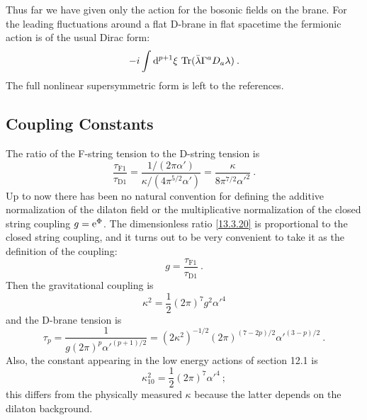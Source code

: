 Thus far we have given only the action for the bosonic fields on the brane. For the leading fluctuations around a flat D-brane in flat spacetime the fermionic action is of the usual Dirac form:
\begin{equation}
	-i\int \mathrm{d}^{p+1}\xi\,\operatorname{Tr}(\bar{\lambda}\Gamma^a D_a\lambda) \:. \label{13.3.19}
\end{equation}
The full nonlinear supersymmetric form is left to the references.

\subsection*{Coupling Constants}

The ratio of the F-string tension to the D-string tension is
\begin{equation}
	\frac{\tau_{\mathrm{F}1}}{\tau_{\mathrm{D}1}} = \frac{1/(2\pi\alpha')}{\kappa/(4\pi^{5/2}\alpha')} = \frac{\kappa}{8\pi^{7/2}{\alpha'}^2} \:. \label{13.3.20}
\end{equation}
Up to now there has been no natural convention for defining the additive normalization of the dilaton field or the multiplicative normalization of the closed string coupling $g = \mathrm{e}^{\Phi}$. The dimensionless ratio \eqref{13.3.20} is proportional to the closed string coupling, and it turns out to be very convenient to take it as the definition of the coupling:
\begin{equation}
	g = \frac{\tau_{\mathrm{F}1}}{\tau_{\mathrm{D}1}} \:. \label{13.3.21}
\end{equation}
Then the gravitational coupling is
\begin{equation}
	\kappa^2 = \frac{1}{2}(2\pi)^7 g^2 {\alpha'}^4 \label{13.3.22}
\end{equation}
and the D-brane tension is
\begin{equation}
	\tau_p = \frac{1}{g(2\pi)^p{\alpha'}^{(p+1)/2}} = (2\kappa^2)^{-1/2}(2\pi)^{(7-2p)/2}{\alpha'}^{(3-p)/2} \:. \label{13.3.23}
\end{equation}
Also, the constant appearing in the low energy actions of section 12.1 is
\begin{equation}
	\kappa_{10}^2 = \frac{1}{2}(2\pi)^7{\alpha'}^4 \:; \label{13.3.24}
\end{equation}
this differs from the physically measured $\kappa$ because the latter depends on the dilaton background.


